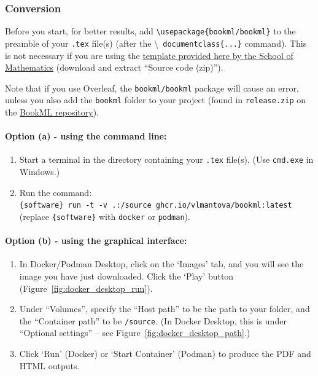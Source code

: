 \subsubsection{Conversion}
\label{sssec:conversion}

Before you start, for better results, add \verb|\usepackage{bookml/bookml}| to the preamble of your \verb|.tex| file(s) (after the \textbackslash\verb| documentclass{...}| command). This is not necessary if you are using the \href{https://github.com/UoE-School-of-Mathematics/Workflow-Template-Blank/releases}{template provided here by the School of Mathematics} (download and extract ``Source code (zip)'').

Note that if you use Overleaf, the \verb|bookml/bookml| package will cause an error, unless you also add the \verb|bookml| folder to your project (found in \verb|release.zip| on the \href{https://github.com/vlmantova/bookml/releases}{BookML repository}).

\paragraph{Option (a) - using the command line:}

\begin{enumerate}
    \item Start a terminal in the directory containing your \verb|.tex| file(s). (Use \verb|cmd.exe| in Windows.)
    \item Run the command:\\
        \verb|{software} run -t -v .:/source ghcr.io/vlmantova/bookml:latest|\\
        (replace \verb|{software}| with \verb|docker| or \verb|podman|).
\end{enumerate}

\paragraph{Option (b) - using the graphical interface:}

\begin{enumerate}
    \item In Docker/Podman Desktop, click on the `Images' tab, and you will see the image you have just downloaded. Click the `Play' button (Figure~\ref{fig:docker_desktop_run}).
    \item Under ``Volumes'', specify the ``Host path'' to be the path to your folder, and the ``Container path'' to be \verb|/source|. (In Docker Desktop, this is under ``Optional settings'' -- see Figure~\ref{fig:docker_desktop_path}.)
    \item Click `Run' (Docker) or `Start Container' (Podman) to produce the PDF and HTML outputs.
\end{enumerate}

